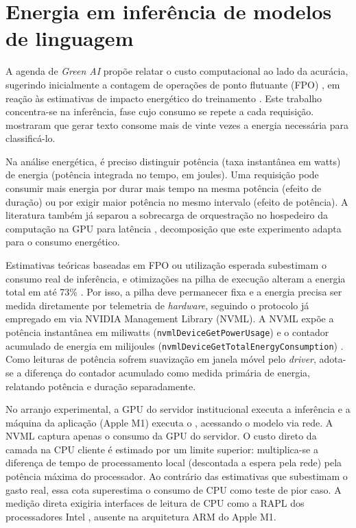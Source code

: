 \section{Energia em inferência de modelos de linguagem}
\label{sec:energia}

A agenda de \textit{Green AI} propõe relatar o custo computacional ao lado da
acurácia, sugerindo inicialmente a contagem de operações de ponto flutuante
(FPO) \cite{schwartz2020}, em reação às estimativas de impacto
energético do treinamento \cite{strubell2019}. Este trabalho concentra-se na
inferência, fase cujo consumo se repete a cada requisição. 
mostraram que gerar texto consome mais de vinte vezes a energia necessária para
classificá-lo.

Na análise energética, é preciso distinguir potência (taxa instantânea em
watts) de energia (potência integrada no tempo, em joules). Uma requisição pode
consumir mais energia por durar mais tempo na mesma potência (efeito de duração)
ou por exigir maior potência no mesmo intervalo (efeito de potência). A
literatura também já separou a sobrecarga de orquestração no hospedeiro da
computação na GPU para latência \cite{vellaisamy2026}, decomposição que este
experimento adapta para o consumo energético.

Estimativas teóricas baseadas em FPO ou utilização esperada subestimam o
consumo real de inferência, e otimizações na pilha de execução alteram a energia
total em até 73\% \cite{fernandez2025}. Por isso, a pilha deve permanecer fixa e
a energia precisa ser medida diretamente por telemetria de \textit{hardware},
seguindo o protocolo já empregado em  via NVIDIA
Management Library (NVML). A NVML expõe a potência instantânea em
miliwatts (\texttt{nvmlDevice\-GetPowerUsage}) e o contador acumulado de energia
em milijoules (\texttt{nvmlDevice\-GetTotalEnergy\-Consumption}) \cite{nvml}.
Como leituras de potência sofrem suavização em janela móvel pelo
\textit{driver}, adota-se a diferença do contador acumulado como medida primária
de energia, relatando potência e duração separadamente.

No arranjo experimental, a GPU do servidor institucional executa a inferência e
a máquina da aplicação (Apple M1) executa o \harness{}, acessando o modelo via
rede. A NVML captura apenas o consumo da GPU do servidor. O custo direto da
camada na CPU cliente é estimado por um limite superior: multiplica-se a
diferença de tempo de processamento local (descontada a espera pela rede) pela
potência máxima do processador. Ao contrário das estimativas que subestimam o
gasto real, essa cota superestima o consumo de CPU como teste de pior caso. A
medição direta exigiria interfaces de leitura de CPU como a RAPL
dos processadores Intel \cite{khan2018}, ausente na arquitetura ARM do Apple M1.

